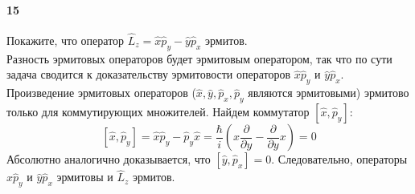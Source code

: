 


\paragraph{15} Покажите, что оператор $\hat{L}_z = \hat{x}\hat{p}_y-\hat{y}\hat{p}_x$ эрмитов.\\

Разность эрмитовых операторов будет эрмитовым оператором, так что по сути задача сводится к доказательству эрмитовости операторов $\hat{x}\hat{p}_y$ и $\hat{y}\hat{p}_x$. \\
Произведение эрмитовых операторов ($\hat{x}, \hat{y}, \hat{p}_x, \hat{p}_y$ являются эрмитовыми) эрмитово только для коммутирующих множителей. Найдем коммутатор $[\hat{x}, \hat{p}_y]$:
$$
[\hat{x}, \hat{p}_y]=\hat{x}\hat{p}_y-\hat{p}_y\hat{x}=\frac{\hbar}{i}\left(x\frac{\partial}{\partial y}-\frac{\partial}{\partial y} x\right) =0
$$ 
Абсолютно аналогично доказывается, что $[\hat{y}, \hat{p}_x]=0$. Следовательно, операторы $\hat{x}\hat{p}_y$ и $\hat{y}\hat{p}_x$ эрмитовы и $\hat{L}_z$ эрмитов.

